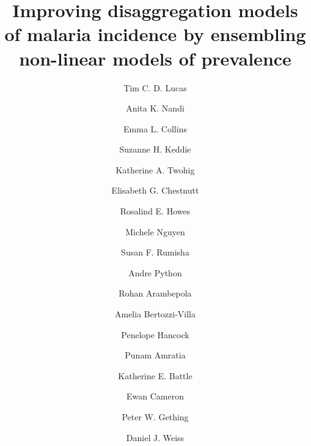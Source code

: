 \documentclass[review]{elsarticle}
\begin{document}









\begin{frontmatter}

\title{Improving disaggregation models of malaria incidence by ensembling non-linear models of prevalence}

\author[oxford]{Tim C. D. Lucas}
\author[oxford]{Anita K. Nandi}
\author[oxford]{Emma L. Collins}
\author[oxford]{Suzanne H. Keddie}
\author[oxford]{Katherine A. Twohig}
\author[oxford]{Elisabeth G. Chestnutt}
\author[oxford]{Rosalind E. Howes}
\author[oxford]{Michele Nguyen}
\author[oxford]{Susan F. Rumisha}
\author[oxford]{Andre Python}
\author[oxford]{Rohan Arambepola}
\author[oxford,idm]{Amelia Bertozzi-Villa}
\author[oxford]{Penelope Hancock}
\author[oxford]{Punam Amratia}
\author[oxford]{Katherine E. Battle}
\author[oxford]{Ewan Cameron}
\author[oxford,telethon,curtin]{Peter W. Gething}
\author[oxford]{Daniel J. Weiss}



\address[oxford]{Malaria Atlas Project, Big Data Institute, University of Oxford, Oxford, UK}
\address[idm]{Institute for Disease Modeling, Bellevue, WA, USA}
\address[telethon]{Telethon Kids Institute, Perth Children’s Hospital, Perth, Australia}
\address[curtin]{Curtin University, Perth, Australia}



\begin{abstract}


\end{abstract}
\end{frontmatter}
\end{document}
